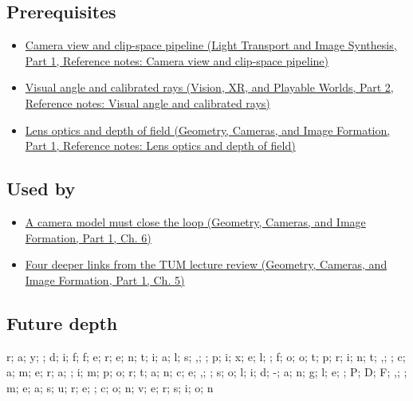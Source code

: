 \subsection{Prerequisites}\label{appendix-8c40fad29462-prerequisites}

\hypertarget{appendix-8c40fad29462-prerequisites}{}

\begin{itemize}
\tightlist
\item
  \href{../04-Light-Transport-and-Image-Synthesis-P01/main.pdf\#nameddest=appendix-1c07d64f5e70}{Camera view and clip-space pipeline (Light Transport and Image Synthesis, Part 1, Reference notes: Camera view and clip-space pipeline)}
\item
  \href{../07-Vision-XR-and-Playable-Worlds-P02/main.pdf\#nameddest=appendix-7d356c396d1a}{Visual angle and calibrated rays (Vision, XR, and Playable Worlds, Part 2, Reference notes: Visual angle and calibrated rays)}
\item
  \href{../03-Geometry-Cameras-and-Image-Formation-P01/main.pdf\#nameddest=appendix-21f8456e2629}{Lens optics and depth of field (Geometry, Cameras, and Image Formation, Part 1, Reference notes: Lens optics and depth of field)}
\end{itemize}

\subsection{Used by}\label{appendix-8c40fad29462-used-by}

\hypertarget{appendix-8c40fad29462-used-by}{}

\begin{itemize}
\tightlist
\item
  \href{../03-Geometry-Cameras-and-Image-Formation-P01/main.pdf\#nameddest=02-foundations-ii-ch037-a-camera-model-must-close-the-loop}{A camera model must close the loop (Geometry, Cameras, and Image Formation, Part 1, Ch. 6)}
\item
  \href{../03-Geometry-Cameras-and-Image-Formation-P01/main.pdf\#nameddest=02-foundations-ii-ch036-four-deeper-links-from-the-tum-lecture-review}{Four deeper links from the TUM lecture review (Geometry, Cameras, and Image Formation, Part 1, Ch. 5)}
\end{itemize}

\subsection{Future depth}\label{appendix-8c40fad29462-future-depth}

\hypertarget{appendix-8c40fad29462-future-depth}{}

r; a; y; ; d; i; f; f; e; r; e; n; t; i; a; l; s; ,; ; p; i; x; e; l; ; f; o; o; t; p; r; i; n; t; ,; ; c; a; m; e; r; a; ; i; m; p; o; r; t; a; n; c; e; ,; ; s; o; l; i; d; -; a; n; g; l; e; ; P; D; F; ,; ; m; e; a; s; u; r; e; ; c; o; n; v; e; r; s; i; o; n
